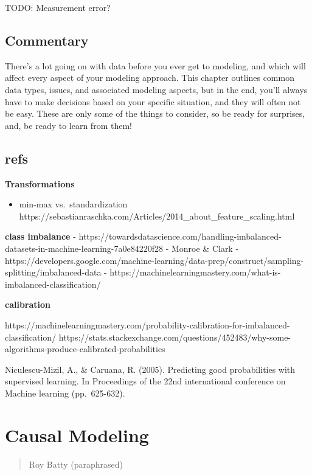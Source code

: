 \documentclass[
  letterpaper,
]{krantz}
\providecommand{\tightlist}{%
  \setlength{\itemsep}{0pt}\setlength{\parskip}{0pt}}\usepackage{longtable,booktabs,array}
\begin{document}
TODO: Measurement error?

\section{Commentary}\label{commentary-1}

There's a lot going on with data before you ever get to modeling, and
which will affect every aspect of your modeling approach. This chapter
outlines common data types, issues, and associated modeling aspects, but
in the end, you'll always have to make decisions based on your specific
situation, and they will often not be easy. These are only some of the
things to consider, so be ready for surprises, and, be ready to learn
from them!

\section{refs}\label{refs-3}

\textbf{Transformations}

\begin{itemize}
\tightlist
\item
  min-max vs.~standardization
  https://sebastianraschka.com/Articles/2014\_about\_feature\_scaling.html
\end{itemize}

\textbf{class imbalance} -
https://towardsdatascience.com/handling-imbalanced-datasets-in-machine-learning-7a0e84220f28
- Monroe \& Clark -
https://developers.google.com/machine-learning/data-prep/construct/sampling-splitting/imbalanced-data
- https://machinelearningmastery.com/what-is-imbalanced-classification/

\textbf{calibration}

https://machinelearningmastery.com/probability-calibration-for-imbalanced-classification/
https://stats.stackexchange.com/questions/452483/why-some-algorithms-produce-calibrated-probabilities

Niculescu-Mizil, A., \& Caruana, R. (2005). Predicting good
probabilities with supervised learning. In Proceedings of the 22nd
international conference on Machine learning (pp.~625-632).

\chapter{Causal Modeling}\label{causal-modeling}

\begin{quote}
\begin{description}
\tightlist
\item[All those causal effects will be lost in time, like tears in
rain\ldots{} without adequate counterfactual considerations.]
Roy Batty (paraphrased)
\end{description}
\end{quote}
\end{document}
